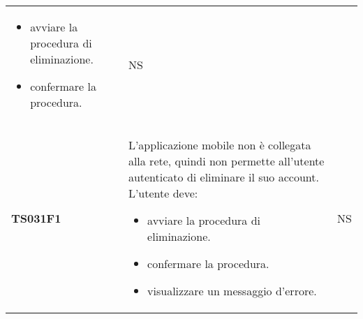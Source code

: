 \documentclass[../piano-di-qualifica.tex]{subfiles}
\begin{document}
\begin{centering}
\begin{longtable}[H]{>{\centering\bfseries}m{3cm} >{}p{10cm} >{\centering\arraybackslash}m{3cm}}
                        \begin{itemize}
                          \item avviare la procedura di eliminazione.
                          \item confermare la procedura.
                        \end{itemize}
                    & NS \\
        TS031F1     & L'applicazione mobile non è collegata alla rete, quindi non permette all'utente autenticato di eliminare il suo account. \newline
                      L'utente deve:
                        \begin{itemize}
                          \item avviare la procedura di eliminazione.
                          \item confermare la procedura.
                          \item visualizzare un messaggio d'errore.
                        \end{itemize}
                    & NS \\



\end{longtable}
\end{centering}
\end{document}
